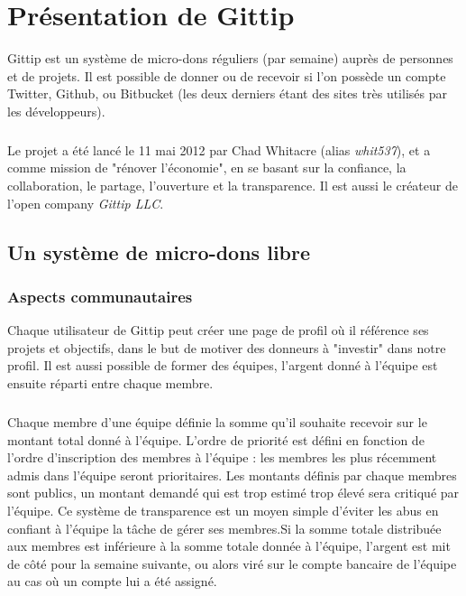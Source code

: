 \chapter{Présentation de Gittip}

Gittip est un système de micro-dons réguliers (par semaine) auprès de personnes
et de projets. Il est possible de donner ou de recevoir si l'on possède un
compte Twitter, Github, ou Bitbucket (les deux derniers étant des sites très
utilisés par les développeurs).

\paragraph{}
Le projet a été lancé le 11 mai 2012 par Chad Whitacre (alias \emph{whit537}),
et a comme mission de "rénover l'économie", en se basant sur la confiance, la
collaboration, le partage, l'ouverture et la transparence. Il est aussi le
créateur de l'open company \emph{Gittip LLC}.


    \section{Un système de micro-dons libre}

    \subsection{Aspects communautaires}

Chaque utilisateur de Gittip peut créer une page de profil où il référence ses
projets et objectifs, dans le but de motiver des donneurs à "investir" dans
notre profil. Il est aussi possible de former des équipes, l'argent donné à
l'équipe est ensuite réparti entre chaque membre.

\paragraph{}
Chaque membre d'une équipe définie la somme qu'il souhaite recevoir sur le
montant total donné à l'équipe. L'ordre de priorité est défini en fonction de
l'ordre d'inscription des membres à l'équipe : les membres les plus récemment
admis dans l'équipe seront prioritaires. Les montants définis par chaque
membres sont publics, un montant demandé qui est trop estimé trop élevé sera
critiqué par l'équipe. Ce système de transparence est un moyen simple d'éviter
les abus en confiant à l'équipe la tâche de gérer ses membres.Si la somme
totale distribuée aux membres est inférieure à la somme totale donnée à
l'équipe, l'argent est mit de côté pour la semaine suivante, ou alors viré sur
le compte bancaire de l'équipe au cas où un compte lui a été assigné.

